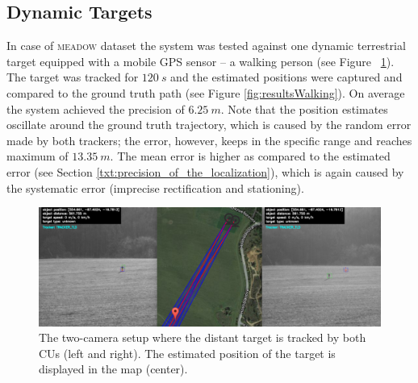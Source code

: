 \subsection{Dynamic Targets}

In case of \textsc{meadow} dataset the system was tested against one dynamic terrestrial target equipped with a mobile GPS sensor -- a walking person (see Figure~ \ref{fig:trackingAndMap}). The target was tracked for $120~s$ and the estimated positions were captured and compared to the ground truth path (see Figure \ref{fig:resultsWalking}). On average the system achieved the precision of $6.25~m$. Note that the position estimates oscillate around the ground truth trajectory, which is caused by the random error made by both trackers; the error, however, keeps in the specific range and reaches maximum of $13.35~m$. The mean error is higher as compared to the estimated error (see Section \ref{txt:precision_of_the_localization}), which is again caused by the systematic error (imprecise rectification and stationing).

\begin{figure}[!h]\centering
	\centering
	\includegraphics[width=0.98\linewidth]{fig/tracking_and_map.png}
	\caption{The two-camera setup where the distant target is tracked by both CUs (left and right). The estimated position of the target is displayed in the map (center).}
	\label{fig:trackingAndMap}
\end{figure}

